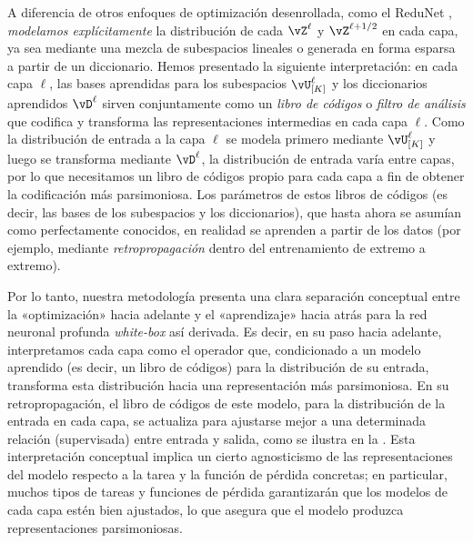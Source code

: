 \documentclass[../../book-main.tex]{subfiles}
\begin{document}
\begin{remark}\label{sub:forward_backward}
    A diferencia de otros enfoques de optimización desenrollada, como el
    ReduNet \cite{chan2021redunet}, \textit{modelamos explícitamente} la
    distribución de cada $\vZ^\ell$ y $\vZ^{\ell + 1/2}$ en cada
    capa, ya sea mediante una mezcla de subespacios lineales o generada en forma esparsa
    a partir de un diccionario. Hemos presentado la siguiente interpretación:
    en cada capa \(\ell\), las bases aprendidas para los subespacios
    \(\vU_{[K]}^{\ell}\) y los diccionarios aprendidos \(\vD^{\ell}\)
    sirven conjuntamente como un \textit{libro de códigos} o \textit{filtro de análisis}
    que codifica y transforma las representaciones intermedias en
    cada capa \(\ell\). Como la distribución de entrada a la capa
    \(\ell\) se modela primero mediante \(\vU_{[K]}^{\ell}\) y luego
    se transforma mediante \(\vD^{\ell}\), la distribución de entrada varía
    entre capas, por lo que necesitamos un libro de códigos propio para cada
    capa a fin de obtener la codificación más parsimoniosa. Los parámetros de
    estos libros de códigos (es decir, las bases de los subespacios y los diccionarios),
    que hasta ahora se asumían como perfectamente conocidos, en realidad se aprenden
    a partir de los datos (por ejemplo, mediante \textit{retropropagación} dentro
    del entrenamiento de extremo a extremo).

    Por lo tanto, nuestra metodología presenta una clara separación conceptual
    entre la «optimización» hacia adelante y el «aprendizaje» hacia atrás para
    la red neuronal profunda \textit{white-box} así derivada. Es decir, en su
    paso hacia adelante, interpretamos cada capa como el operador que,
    condicionado a un modelo aprendido (es decir, un libro de códigos) para la
    distribución de su entrada, transforma esta distribución hacia 
    una representación más parsimoniosa. En su retropropagación,
    el libro de códigos de este modelo, para la distribución de la entrada en
    cada capa, se actualiza para ajustarse mejor a una determinada relación (supervisada)
    entre entrada y salida, como se ilustra en la
    . Esta interpretación conceptual
    implica un cierto agnosticismo de las representaciones del modelo
    respecto a la tarea y la función de pérdida concretas; en particular, muchos tipos
    de tareas y funciones de pérdida garantizarán que los modelos de cada capa estén
    bien ajustados, lo que asegura que el modelo produzca representaciones parsimoniosas.
\end{remark}
\end{document}
